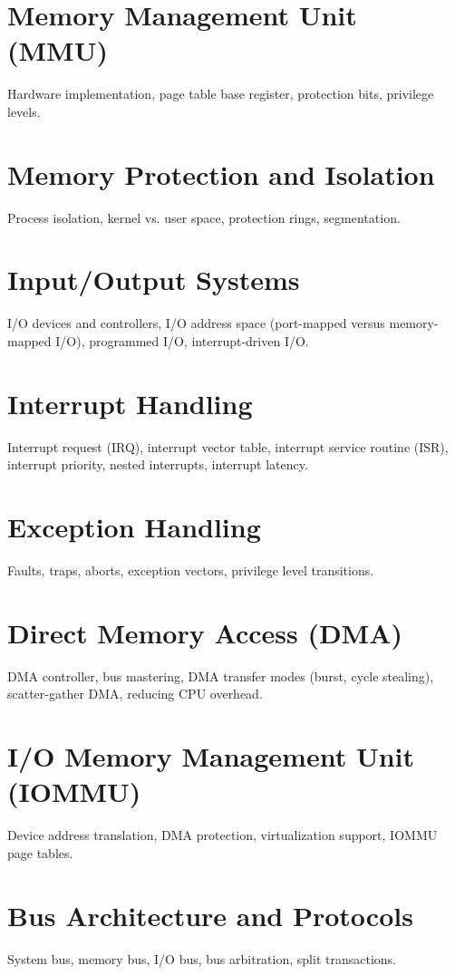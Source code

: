 \chapter{Memory Management Unit (MMU)}
Hardware implementation, page table base register, protection bits, privilege levels.

\chapter{Memory Protection and Isolation}
Process isolation, kernel vs. user space, protection rings, segmentation.


\chapter{Input/Output Systems}
I/O devices and controllers, I/O address space (port-mapped versus memory-mapped I/O), programmed I/O, interrupt-driven I/O.

\chapter{Interrupt Handling}
Interrupt request (IRQ), interrupt vector table, interrupt service routine (ISR), interrupt priority, nested interrupts, interrupt latency.

\chapter{Exception Handling}
Faults, traps, aborts, exception vectors, privilege level transitions.

\chapter{Direct Memory Access (DMA)}
DMA controller, bus mastering, DMA transfer modes (burst, cycle stealing), scatter-gather DMA, reducing CPU overhead.

\chapter{I/O Memory Management Unit (IOMMU)}
Device address translation, DMA protection, virtualization support, IOMMU page tables.

\chapter{Bus Architecture and Protocols}
System bus, memory bus, I/O bus, bus arbitration, split transactions.

